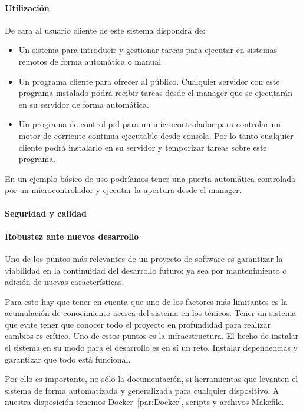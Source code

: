 \paragraph{Utilización}
    De cara al usuario cliente de este sistema dispondrá de:
    \begin{itemize}
        \item Un sistema para introducir y gestionar tareas para ejecutar en sistemas remotos de forma automática o manual
        \item Un programa cliente para ofrecer al público. Cualquier servidor con este programa instalado podrá recibir tareas desde el manager que se ejecutarán en su servidor de forma automática.
        \item Un programa de control pid para un microcontrolador para controlar un motor de corriente continua ejecutable desde consola. Por lo tanto cualquier cliente podrá instalarlo en su servidor y temporizar tareas sobre este programa.
    \end{itemize}

En un ejemplo básico de uso podríamos tener una puerta automática controlada por un microcontrolador y ejecutar la apertura desde el manager.

\paragraph{Seguridad y calidad}\label{par:testing}
    
\paragraph{Robustez ante nuevos desarrollo}

Uno de los puntos más relevantes de un proyecto de software es garantizar la viabilidad en la continuidad del desarrollo futuro; ya sea por mantenimiento o adición de nuevas características.

Para esto hay que tener en cuenta que uno de los factores más limitantes es la acumulación de conocimiento acerca del sistema en los ténicos. Tener un sistema que evite tener que conocer todo el proyecto en profundidad para realizar cambios es crítico. Uno de estos puntos es la infraestructura. El hecho de instalar el sistema en su modo para el desarrollo es en sí un reto. Instalar dependencias y garantizar que todo está funcional.

Por ello es importante, no sólo la documentación, si herramientas que levanten el sistema de forma automatizada y generalizada para cualquier dispositivo. A nuestra disposición tenemos Docker~\cref{par:Docker}, scripts y archivos Makefile.

